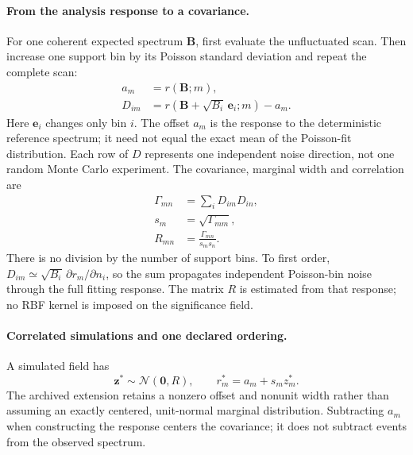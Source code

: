 \paragraph{From the analysis response to a covariance.}
For one coherent expected spectrum $\bm B$, first evaluate the unfluctuated
scan. Then increase one support bin by its Poisson standard deviation and
repeat the complete scan:
\begin{align}
 a_m&=r(\bm B;m),\\
 D_{im}&=r(\bm B+\sqrt{B_i}\,\bm e_i;m)-a_m.
 \label{eq:v501-response-directions}
\end{align}
Here $\bm e_i$ changes only bin $i$. The offset $a_m$ is the response to
the deterministic reference spectrum; it need not equal the exact mean
of the Poisson-fit distribution. Each row of $D$ represents one
independent noise direction, not one random Monte Carlo experiment.
The covariance, marginal width and correlation are
\begin{align}
 \Gamma_{mn}&=\sum_i D_{im}D_{in},
 \label{v5-eq:field-response}\\
 s_m&=\sqrt{\Gamma_{mm}},\\
 R_{mn}&=\frac{\Gamma_{mn}}{s_ms_n}.
 \label{eq:v501-field-correlation}
\end{align}
There is no division by the number of support bins. To first order,
$D_{im}\simeq\sqrt{B_i}\,\partial r_m/\partial n_i$, so the sum propagates
independent Poisson-bin noise through the full fitting response. The
matrix $R$ is estimated from that response; no RBF kernel is imposed on
the significance field.

\paragraph{Correlated simulations and one declared ordering.}
A simulated field has
\begin{equation}
 \bm z^*\sim\mathcal N(\bm0,R),\qquad
 r_m^*=a_m+s_m z_m^*.
 \label{eq:v501-field-draw}
\end{equation}
The archived extension retains a nonzero offset and nonunit width rather
than assuming an exactly centered, unit-normal marginal distribution.
Subtracting $a_m$ when constructing the response centers the covariance;
it does not subtract events from the observed spectrum.

